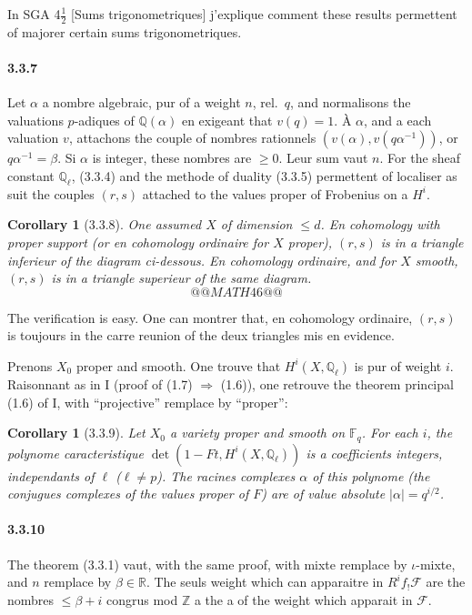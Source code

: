 \documentclass[12pt,a4paper]{article}
\theoremstyle{plain}
\newtheorem{corollary}[theorem]{Corollary}
\theoremstyle{definition}
\theoremstyle{remark}
\newcommand{\FF}{{\mathbb{F}}}
\newcommand{\QQ}{{\mathbb{Q}}}
\newcommand{\RR}{{\mathbb{R}}}
\newcommand{\ZZ}{{\mathbb{Z}}}
\begin{document}
In SGA 4$\frac{1}{2}$ [Sums trigonometriques] j'explique comment these results permettent of majorer certain sums trigonometriques.

\paragraph{3.3.7}
Let $\alpha$ a nombre algebraic, pur of a weight $n$, rel.~$q$, and normalisons the valuations $p$-adiques of $\QQ(\alpha)$ en exigeant that $v(q) = 1$. \`A $\alpha$, and a each valuation $v$, attachons the couple of nombres rationnels $(v(\alpha), v(q\alpha^{-1}))$, or $q\alpha^{-1} = \beta$. Si $\alpha$ is integer, these nombres are $\geq 0$. Leur sum vaut $n$. For the sheaf constant $\QQ_\ell$, (3.3.4) and the methode of duality (3.3.5) permettent of localiser as suit the couples $(r, s)$ attached to the values proper of Frobenius on a $H^i$.


\begin{corollary}[3.3.8]
One assumed $X$ of dimension $\leq d$. En cohomology with proper support (or en cohomology ordinaire for $X$ proper), $(r, s)$ is in a triangle inferieur of the diagram ci-dessous. En cohomology ordinaire, and for $X$ smooth, $(r, s)$ is in a triangle superieur of the same diagram.
\[
@@MATH46@@
\]
\end{corollary}

The verification is easy. One can montrer that, en cohomology ordinaire, $(r, s)$ is toujours in the carre reunion of the deux triangles mis en evidence.

Prenons $X_0$ proper and smooth. One trouve that $H^i(X, \QQ_\ell)$ is pur of weight $i$. Raisonnant as in I (proof of (1.7) $\Rightarrow$ (1.6)), one retrouve the theorem principal (1.6) of I, with ``projective'' remplace by ``proper'':

\begin{corollary}[3.3.9]
Let $X_0$ a variety proper and smooth on $\FF_q$. For each $i$, the polynome caracteristique $\det(1 - Ft, H^i(X, \QQ_\ell))$ is a coefficients integers, independants of $\ell$ ($\ell \neq p$). The racines complexes $\alpha$ of this polynome (the conjugues complexes of the values proper of $F$) are of value absolute $|\alpha| = q^{i/2}$.
\end{corollary}

\paragraph{3.3.10}
The theorem (3.3.1) vaut, with the same proof, with mixte remplace by $\iota$-mixte, and $n$ remplace by $\beta \in \RR$. The seuls weight which can apparaitre in $R^i f_! \mathscr{F}$ are the nombres $\leq \beta + i$ congrus mod $\ZZ$ a the a of the weight which apparait in $\mathscr{F}$.
\end{document}
